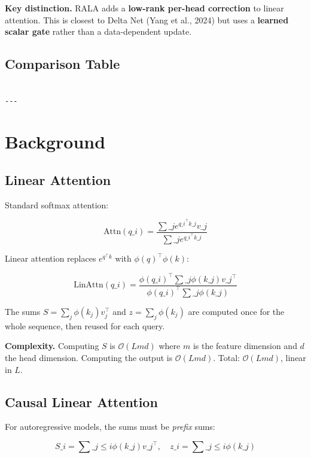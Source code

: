 \textbf{Key distinction.} RALA adds a \textbf{low-rank per-head correction} to linear 
attention. This is closest to Delta Net (Yang et al., 2024) but uses a 
\textbf{learned scalar gate} rather than a data-dependent update.



\subsection{Comparison Table}

\begin{lstlisting}

---
\end{lstlisting}


\section{Background}

\subsection{Linear Attention}

Standard softmax attention:

\[
\text{Attn}(q\_i) = \frac{\sum\_j e^{q\_i^\top k\_j} v\_j}{\sum\_j e^{q\_i^\top k\_j}}
\tag{3.1}
\]

Linear attention replaces $e^{q^\top k}$ with $\phi(q)^\top \phi(k)$:

\[
\text{LinAttn}(q\_i) = \frac{\phi(q\_i)^\top \sum\_j \phi(k\_j) v\_j^\top}{\phi(q\_i)^\top \sum\_j \phi(k\_j)}
\tag{3.2}
\]

The sums $S = \sum_j \phi(k_j) v_j^\top$ and $z = \sum_j \phi(k_j)$ are 
computed once for the whole sequence, then reused for each query.

\textbf{Complexity.} Computing $S$ is $\mathcal{O}(L m d)$ where $m$ is the 
feature dimension and $d$ the head dimension. Computing the output is 
$\mathcal{O}(L m d)$. Total: $\mathcal{O}(L m d)$, linear in $L$.

\subsection{Causal Linear Attention}

For autoregressive models, the sums must be \textit{prefix} sums:

\[
S\_i = \sum\_{j \le i} \phi(k\_j) v\_j^\top, \quad
z\_i = \sum\_{j \le i} \phi(k\_j)
\tag{3.3}
\]

